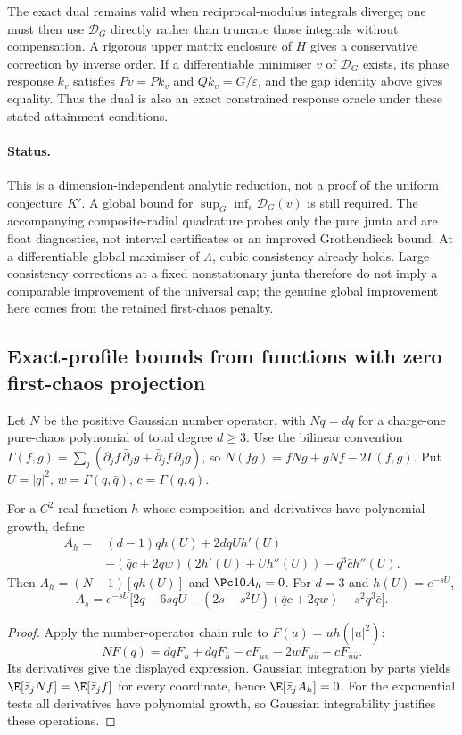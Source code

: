 The exact dual remains valid when reciprocal-modulus integrals diverge;
one must then use $\mathcal D_G$ directly rather than truncate those
integrals without compensation. A rigorous upper matrix enclosure of $H$
gives a conservative correction by inverse order.
If a differentiable minimiser $v$ of $\mathcal D_G$ exists, its phase
response $k_v$ satisfies $Pv=Pk_v$ and $Qk_v=G/\varepsilon$, and the
gap identity above gives equality. Thus the dual is also an exact
constrained response oracle under these stated attainment conditions.

\paragraph{Status.}
This is a dimension-independent analytic reduction, not a proof of the
uniform conjecture $K'$. A global bound for
$\sup_G\inf_v\mathcal D_G(v)$ is still required. The accompanying
composite-radial quadrature probes only the pure junta and are float
diagnostics, not interval certificates or an improved Grothendieck bound.
At a differentiable global maximiser of $\Lambda$, cubic consistency
already holds. Large consistency corrections at a fixed nonstationary
junta therefore do not imply a comparable improvement of the universal
cap; the genuine global improvement here comes from the retained
first-chaos penalty.

\subsection{Exact-profile bounds from functions with zero first-chaos projection}
\label{sec:exact-profile-annihilators}
Let $N$ be the positive Gaussian number operator, with
$Nq=dq$ for a charge-one pure-chaos polynomial of total degree $d\ge3$.
Use the bilinear convention
$\Gamma(f,g)=\sum_j(\partial_j f\,\bar\partial_jg+
\bar\partial_j f\,\partial_jg)$, so
$N(fg)=fNg+gNf-2\Gamma(f,g)$. Put
$U=|q|^2$, $w=\Gamma(q,\bar q)$, $c=\Gamma(q,q)$.
\begin{proposition}
For a $C^2$ real function $h$ whose composition and derivatives have
polynomial growth, define
\[
\begin{split}
A_h={}&(d-1)qh(U)+2d qUh'(U)\\
&-(\bar q c+2qw)(2h'(U)+Uh''(U))-q^3\bar c h''(U).
\end{split}
\]
Then $A_h=(N-1)[qh(U)]$ and $\Pc10 A_h=0$.
For $d=3$ and $h(U)=e^{-sU}$,
\[
A_s=e^{-sU}\bigl[2q-6s qU+(2s-s^2U)(\bar q c+2qw)
-s^2q^3\bar c\bigr].
\]
\end{proposition}
\begin{proof}
Apply the number-operator chain rule to $F(u)=uh(|u|^2)$:
\[
NF(q)=dqF_u+d\bar qF_{\bar u}-cF_{uu}
-2wF_{u\bar u}-\bar cF_{\bar u\bar u}.
\]
Its derivatives give the displayed expression. Gaussian integration by
parts yields $\E[\bar z_jNf]=\E[\bar z_jf]$ for every coordinate, hence
$\E[\bar z_jA_h]=0$. For the exponential tests all derivatives have
polynomial growth, so Gaussian integrability justifies these operations.
\end{proof}

